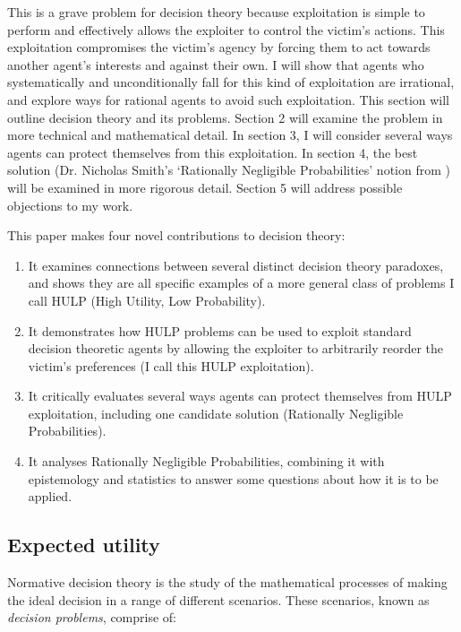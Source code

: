 \documentclass{article}
\begin{document}
This is a grave problem for decision theory because exploitation is simple to perform and effectively allows the exploiter to control the victim's actions. This exploitation compromises the victim's agency by forcing them to act towards another agent's interests and against their own. I will show that agents who systematically and unconditionally fall for this kind of exploitation are irrational, and explore ways for rational agents to avoid such exploitation. This section will outline decision theory and its problems. Section 2 will examine the problem in more technical and mathematical detail. In section 3, I will consider several ways agents can protect themselves from this exploitation. In section 4, the best solution (Dr. Nicholas Smith's `Rationally Negligible Probabilities' notion from \citet{smith2014evaluative}) will be examined in more rigorous detail. Section 5 will address possible objections to my work.

This paper makes four novel contributions to decision theory:

\begin{enumerate}
\item It examines connections between several distinct decision theory paradoxes, and shows they are all specific examples of a more general class of problems I call HULP (High Utility, Low Probability).
\item It demonstrates how HULP problems can be used to exploit standard decision theoretic agents by allowing the exploiter to arbitrarily reorder the victim's preferences (I call this HULP exploitation).
\item It critically evaluates several ways agents can protect themselves from HULP exploitation, including one candidate solution (Rationally Negligible Probabilities).
\item It analyses Rationally Negligible Probabilities, combining it with epistemology and statistics to answer some questions about how it is to be applied.
\end{enumerate}

\subsection{Expected utility}
Normative decision theory is the study of the mathematical processes of making the ideal decision in a range of different scenarios. These scenarios, known as \textit{decision problems}, comprise of:
\end{document}
